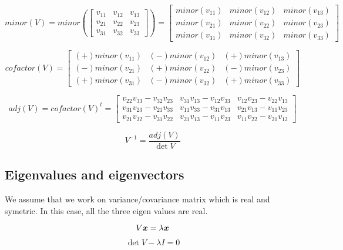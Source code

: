 \documentclass{article}
\newcommand{\bm}[1]{\mbox{\boldmath$#1$}}
\begin{document}
$$
minor(V) =
minor(
\left[\begin{array}{ccc}
 v_{11} & v_{12} & v_{13} \\
 v_{21} & v_{22} & v_{23} \\
 v_{31} & v_{32} & v_{33}
\end{array}\right])
=
\left[\begin{array}{ccc}
 minor(v_{11}) & minor(v_{12}) & minor(v_{13}) \\
 minor(v_{21}) & minor(v_{22}) & minor(v_{23}) \\
 minor(v_{31}) & minor(v_{32}) & minor(v_{33})
\end{array}\right]
$$

$$
cofactor(V)
=
\left[\begin{array}{ccc}
 (+)minor(v_{11}) & (-)minor(v_{12}) & (+)minor(v_{13}) \\
 (-)minor(v_{21}) & (+)minor(v_{22}) & (-)minor(v_{23}) \\
 (+)minor(v_{31}) & (-)minor(v_{32}) & (+)minor(v_{33})
\end{array}\right]
$$


$$
adj(V) = cofactor(V)^t
=
\left[\begin{array}{ccc}
 v_{22}v_{33} - v_{32}v_{23} &
 v_{31}v_{13} - v_{12}v_{33} &
 v_{12}v_{23} - v_{22}v_{13} \\
 v_{31}v_{23} - v_{21}v_{33} &
 v_{11}v_{33} - v_{31}v_{13} &
 v_{21}v_{13} - v_{11}v_{23} \\
 v_{21}v_{32} - v_{31}v_{22} &
 v_{21}v_{13} - v_{11}v_{23} &
 v_{11}v_{22} - v_{21}v_{12}
\end{array}\right]
$$

$$
V^{-1}
=
\frac{adj(V)}{\det V}
$$


\subsection{Eigenvalues and eigenvectors}

We assume that we work on variance/covariance matrix which is real and symetric.
In this case, all the three eigen values are real.

$$
V \bm{x} = \lambda \bm{x}
$$

$$
\det V - \lambda I = 0
$$
\end{document}
